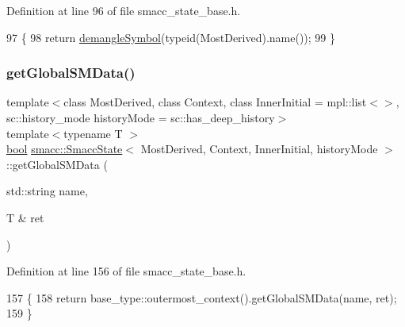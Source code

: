 Definition at line 96 of file smacc\+\_\+state\+\_\+base.\+h.


\begin{DoxyCode}
97     \{
98       \textcolor{keywordflow}{return} \hyperlink{namespacesmacc_1_1introspection_a2f495108db3e57604d8d3ff5ef030302}{demangleSymbol}(\textcolor{keyword}{typeid}(MostDerived).name());
99     \}
\end{DoxyCode}
\mbox{\label{classsmacc_1_1SmaccState_ad53b5be2760eb7ffb50f3b2e542b65f1}} 
\subsubsection{\texorpdfstring{get\+Global\+S\+M\+Data()}{getGlobalSMData()}}
{\footnotesize\ttfamily template$<$class Most\+Derived, class Context, class Inner\+Initial = mpl\+::list$<$$>$, sc\+::history\+\_\+mode history\+Mode = sc\+::has\+\_\+deep\+\_\+history$>$ \\
template$<$typename T $>$ \\
\hyperlink{classbool}{bool} \hyperlink{classsmacc_1_1SmaccState}{smacc\+::\+Smacc\+State}$<$ Most\+Derived, Context, Inner\+Initial, history\+Mode $>$\+::get\+Global\+S\+M\+Data (\begin{DoxyParamCaption}\item[{std\+::string}]{name,  }\item[{T \&}]{ret }\end{DoxyParamCaption})\hspace{0.3cm}{\ttfamily [inline]}}



Definition at line 156 of file smacc\+\_\+state\+\_\+base.\+h.


\begin{DoxyCode}
157     \{
158       \textcolor{keywordflow}{return} base\_type::outermost\_context().getGlobalSMData(name, ret);
159     \}
\end{DoxyCode}
\mbox{\label{classsmacc_1_1SmaccState_a69fc0aa1dbe0c00501f2890616225004}} 

